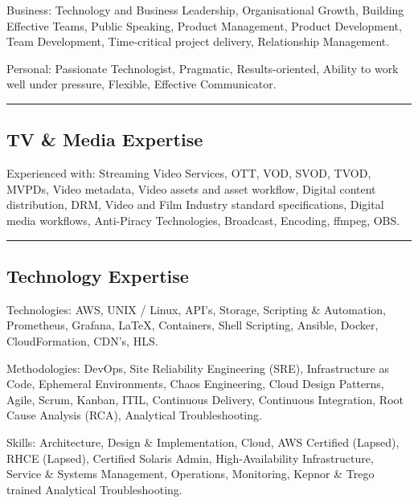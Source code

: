 \documentclass[10pt,a4paper]{article}
\newenvironment{indentsection}[1]%
{\begin{list}{}%
	{\setlength{\leftmargin}{#1}}%
	\item[]%
}
{\end{list}}
\begin{document}
\begin{indentsection}{\parindent}
\begin{description*}
		\item[Business:]
		Technology and Business Leadership, Organisational Growth, Building Effective Teams, Public Speaking, Product Management, Product Development, Team Development, Time-critical project delivery, Relationship Management.
    \item[Personal:]
		Passionate Technologist, Pragmatic, Results-oriented, Ability to work well under pressure, Flexible, Effective Communicator.
\end{description*}
\end{indentsection}

\hrule
\vspace{-0.4em}
\subsection*{TV \& Media Expertise}

\begin{indentsection}{\parindent}
\begin{description*}
	\item[Experienced with:]
	Streaming Video Services, OTT, VOD, SVOD, TVOD, MVPDs, Video metadata, Video assets and asset workflow, Digital content distribution, DRM, Video and Film Industry standard specifications, Digital media workflows, Anti-Piracy Technologies, Broadcast, Encoding, ffmpeg, OBS.

\end{description*}
\end{indentsection}

\hrule
\vspace{-0.4em}
\subsection*{Technology Expertise}

\begin{indentsection}{\parindent}
\begin{description*}
	\item[Technologies:]
	AWS, UNIX / Linux, API's, Storage, Scripting \& Automation, Prometheus, Grafana, \LaTeX, Containers, Shell Scripting, Ansible, Docker, CloudFormation, CDN's, HLS.
	\item[Methodologies:]
	DevOps, Site Reliability Engineering (SRE), Infrastructure as Code, Ephemeral Environments, Chaos Engineering, Cloud Design Patterns, Agile, Scrum, Kanban, ITIL, Continuous Delivery, Continuous Integration, Root Cause Analysis (RCA), Analytical Troubleshooting.
	\item[Skills:]
	Architecture, Design \& Implementation, Cloud, AWS Certified (Lapsed), RHCE (Lapsed), Certified Solaris Admin, High-Availability Infrastructure, Service \& Systems Management, Operations, Monitoring, Kepnor \& Trego trained Analytical Troubleshooting.
\end{description*}
\end{indentsection}
\end{document}
